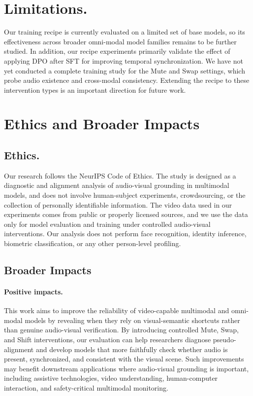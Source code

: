 \documentclass{llmxive}
\begin{document}
\section{Limitations.}
\label{app:limit}
Our training recipe is currently evaluated on a limited set of base models, so its effectiveness across broader omni-modal model families remains to be further studied. In addition, our recipe experiments primarily validate the effect of applying DPO after SFT for improving temporal synchronization. We have not yet conducted a complete training study for the Mute and Swap settings, which probe audio existence and cross-modal consistency. Extending the recipe to these intervention types is an important direction for future work.

\section{Ethics and Broader Impacts}
\label{app:ethics-impact}

\subsection{Ethics.}
Our research follows the NeurIPS Code of Ethics. The study is designed as a diagnostic and alignment analysis of audio-visual grounding in multimodal models, and does not involve human-subject experiments, crowdsourcing, or the collection of personally identifiable information. The video data used in our experiments comes from public or properly licensed sources, and we use the data only for model evaluation and training under controlled audio-visual interventions. Our analysis does not perform face recognition, identity inference, biometric classification, or any other person-level profiling.

\subsection{Broader Impacts}
\paragraph{Positive impacts.}
This work aims to improve the reliability of video-capable multimodal and omni-modal models by revealing when they rely on visual-semantic shortcuts rather than genuine audio-visual verification. By introducing controlled Mute, Swap, and Shift interventions, our evaluation can help researchers diagnose pseudo-alignment and develop models that more faithfully check whether audio is present, synchronized, and consistent with the visual scene. Such improvements may benefit downstream applications where audio-visual grounding is important, including assistive technologies, video understanding, human-computer interaction, and safety-critical multimodal monitoring.
\end{document}
